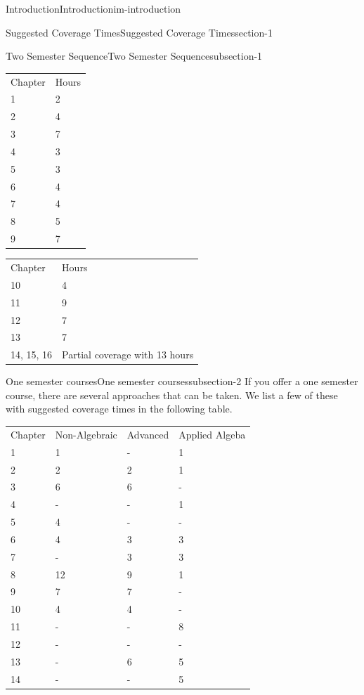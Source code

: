 \documentclass[oneside,10pt,]{book}
\begin{document}
\begin{chapterptx}{Introduction}{}{Introduction}{}{}{im-introduction}
\begin{sectionptx}{Suggested Coverage Times}{}{Suggested Coverage Times}{}{}{section-1}
\begin{subsectionptx}{Two Semester Sequence}{}{Two Semester Sequence}{}{}{subsection-1}
\begin{sidebyside}{2}{0}{0}{0}%
\begin{sbspanel}{0.5}%
{\centering%
\begin{tabular}{ll}
Chapter&Hours\tabularnewline[0pt]
1&2\tabularnewline[0pt]
2&4\tabularnewline[0pt]
3&7\tabularnewline[0pt]
4&3\tabularnewline[0pt]
5&3\tabularnewline[0pt]
6&4\tabularnewline[0pt]
7&4\tabularnewline[0pt]
8&5\tabularnewline[0pt]
9&7
\end{tabular}
\par}
\end{sbspanel}%
\begin{sbspanel}{0.5}%
{\centering%
\begin{tabular}{ll}
Chapter&Hours\tabularnewline[0pt]
10&4\tabularnewline[0pt]
11&9\tabularnewline[0pt]
12&7\tabularnewline[0pt]
13&7\tabularnewline[0pt]
14, 15, 16&Partial coverage with 13 hours
\end{tabular}
\par}
\end{sbspanel}%
\nopagebreak%
\begin{sbscaption}{0.5}%
\end{sbscaption}%
\begin{sbscaption}{0.5}%
\end{sbscaption}%
\end{sidebyside}%
\end{subsectionptx}
%
%
\typeout{************************************************}
\typeout{************************************************}
%
\begin{subsectionptx}{One semester courses}{}{One semester courses}{}{}{subsection-2}
\hypertarget{p-7}{}%
If you offer a one semester course, there are several approaches that can be taken. We list a few of these with suggested coverage times in the following table.%
\begin{table}
\centering
\begin{tabular}{llll}
Chapter&Non-Algebraic&Advanced&Applied Algeba\tabularnewline[0pt]
1&1&-&1\tabularnewline[0pt]
2&2&2&1\tabularnewline[0pt]
3&6&6&-\tabularnewline[0pt]
4&-&-&1\tabularnewline[0pt]
5&4&-&-\tabularnewline[0pt]
6&4&3&3\tabularnewline[0pt]
7&-&3&3\tabularnewline[0pt]
8&12&9&1\tabularnewline[0pt]
9&7&7&-\tabularnewline[0pt]
10&4&4&-\tabularnewline[0pt]
11&-&-&8\tabularnewline[0pt]
12&-&-&-\tabularnewline[0pt]
13&-&6&5\tabularnewline[0pt]
14&-&-&5\tabularnewline[0pt]

\end{tabular}
\end{table}
\end{subsectionptx}
\end{sectionptx}
\end{chapterptx}
\end{document}
